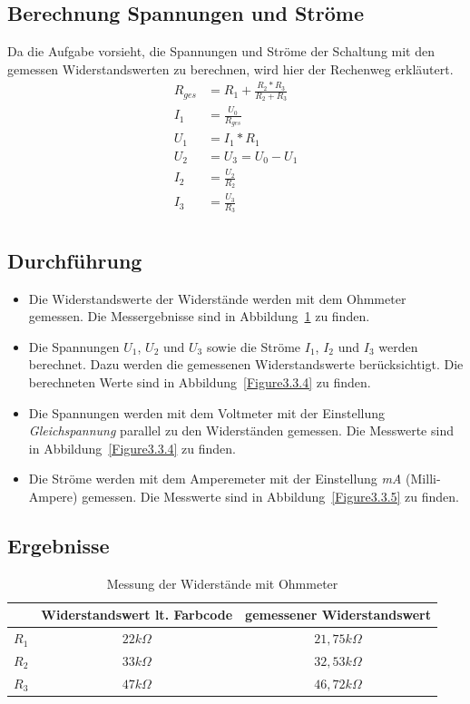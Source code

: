 \documentclass[12pt,a4paper,titlepage]{article}
\begin{document}
\subsection{Berechnung Spannungen und Str\"ome}
Da die Aufgabe vorsieht, die Spannungen und Str\"ome der Schaltung mit den gemessen Widerstandswerten zu berechnen, wird hier der Rechenweg erkl\"autert.
\begin{align*}
  R_{ges} &= R_1 + \frac{R_2*R_3}{R_2 + R_3}\\
  I_{1} &= \frac{U_0}{R_{ges}}\\
  U_{1} &= I_1 * R_1\\
  U_{2} &= U_{3} = U_0 - U_1\\
  I_2 &= \frac{U_2}{R_2}\\
  I_3 &= \frac{U_3}{R_3}\\
\end{align*}

\subsection{Durchf\"uhrung}
\begin{itemize}
  \item Die Widerstandswerte der Widerst\"ande werden mit dem Ohmmeter gemessen. Die Messergebnisse sind in Abbildung~\ref{Figure3.3.3} zu finden.
  \item Die Spannungen $U_1$, $U_2$ und $U_3$ sowie die Str\"ome $I_1$, $I_2$ und $I_3$ werden berechnet. Dazu werden die gemessenen Widerstandswerte ber\"ucksichtigt. Die berechneten Werte sind in Abbildung~\ref{Figure3.3.4} zu finden.
  \item Die Spannungen werden mit dem Voltmeter mit der Einstellung \textit{Gleichspannung} parallel zu den Widerst\"anden gemessen. Die Messwerte sind in Abbildung~\ref{Figure3.3.4} zu finden.
  \item Die Str\"ome werden mit dem Amperemeter mit der Einstellung \textit{mA} (Milli-Ampere) gemessen. Die Messwerte sind in Abbildung~\ref{Figure3.3.5} zu finden.
\end{itemize}

\subsection{Ergebnisse}
\begin{table}[H]
  \centering
  \begin{tabular}{|l|c|c|}
  \hline
     & Widerstandswert lt. Farbcode & gemessener Widerstandswert \\ \hline
  $R_1$ & $22 k\Omega$                    & $21,75 k\Omega$               \\ \hline
  $R_2$ & $33 k\Omega$                    & $32,53 k\Omega$               \\ \hline
  $R_3$ & $47 k\Omega$                    & $46,72 k\Omega$               \\ \hline
  \end{tabular}
  \caption{Messung der Widerst\"ande mit Ohmmeter}
  \label{Figure3.3.3}
\end{table}
\end{document}
